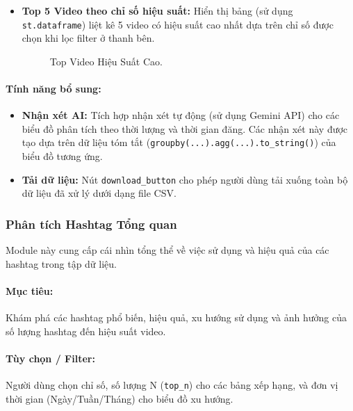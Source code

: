 \begin{itemize}
    \item \textbf{Top 5 Video theo chỉ số hiệu suất:} Hiển thị bảng (sử dụng \texttt{st.dataframe}) liệt kê 5 video có hiệu suất cao nhất dựa trên chỉ số được chọn khi lọc filter ở thanh bên.
    \begin{figure}[h]
        \centering
        \caption{Top Video Hiệu Suất Cao.}
    \end{figure}
\end{itemize}

\paragraph{Tính năng bổ sung:}
    \begin{itemize}
        \item \textbf{Nhận xét AI:} Tích hợp nhận xét tự động (sử dụng Gemini API) cho các biểu đồ phân tích theo thời lượng và thời gian đăng. Các nhận xét này được tạo dựa trên dữ liệu tóm tắt (\texttt{groupby(...).agg(...).to\_string()}) của biểu đồ tương ứng.
        
        \item \textbf{Tải dữ liệu:} Nút \texttt{download\_button} cho phép người dùng tải xuống toàn bộ dữ liệu đã xử lý dưới dạng file CSV.
    \end{itemize}


\subsubsection{Phân tích Hashtag Tổng quan}

Module này cung cấp cái nhìn tổng thể về việc sử dụng và hiệu quả của các hashtag trong tập dữ liệu.

\paragraph{Mục tiêu:} Khám phá các hashtag phổ biến, hiệu quả, xu hướng sử dụng và ảnh hưởng của số lượng hashtag đến hiệu suất video.

\paragraph{Tùy chọn / Filter:} Người dùng chọn chỉ số, số lượng N (\texttt{top\_n}) cho các bảng xếp hạng, và đơn vị thời gian (Ngày/Tuần/Tháng) cho biểu đồ xu hướng.

